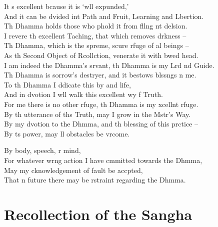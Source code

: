 It s excellent bcause it is `wll expunded,'\\
And it can be dvided int Path and Fruit, Learning and Lbertion.\\
Th Dhamma holds those who phold it from fllng nt delsion.\\
I revere th excellent Taching, that which removes drkness --\\
Th Dhamma, which is the spreme, scure rfuge of al beings --\\
As th Second Object of Rcollction,  venerate it with bwed head.\\
I am indeed the Dhamma's srvant, th Dhamma is my Lrd nd Guide.\\
Th Dhamma is sorrow's destryer, and it bestows blssngs n me.\\
To th Dhamma I ddicate this by and life,\\
And in dvotion I wll walk this excellent wy f Truth.\\
For me there is no other rfuge, th Dhamma is my xcellnt rfuge.\\
By th utterance of ths Truth, may I grow in the Mstr's Way.\\
By my dvotion to the Dhmma, and th blessing of this prctice --\\
By ts power, may ll obstacles be vrcome.


By body, speech, r mind,\\
For whatever wrng action I have cmmitted towards the Dhmma,\\
May my cknowledgement of fault be accpted,\\
That n future there may be rstraint regarding the Dhmma.

\chapter{Recollection of the Sangha}

\begin{leader}
\end{leader}

